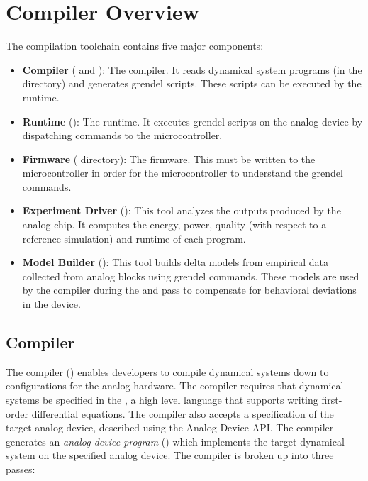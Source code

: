 \chapter{Compiler Overview}

The compilation toolchain contains five major components:

\begin{itemize}
\item\textbf{Compiler} ( and ): The compiler.
  It reads dynamical system programs (in the  directory) and generates
  grendel scripts. These scripts can be executed by the runtime.  
\item\textbf{Runtime} (): The runtime. It executes grendel
  scripts on the analog device by dispatching commands to the microcontroller.
\item\textbf{Firmware} ( directory): The firmware. This must be
  written to the microcontroller in order for the microcontroller to understand
  the grendel commands.
\item\textbf{Experiment Driver} (): This tool analyzes the outputs
  produced by the analog chip. It computes the energy, power, quality (with
  respect to a reference simulation) and runtime of each program.
\item\textbf{Model Builder} (): This tool builds delta
  models from empirical data collected from analog blocks using grendel
  commands. These models are used by the \legno compiler during the \lscale and
  \srcgen pass to compensate for behavioral deviations in the device. 
\end{itemize}


\section{\legno Compiler}

The \legno compiler () enables developers to compile dynamical
systems down to configurations for the analog hardware. The \legno compiler
requires that dynamical systems be specified in the , a high level language that supports writing first-order
differential equations. The \legno compiler also accepts a specification of the
target analog device, described using the Analog Device API. The \legno compiler
generates an \textit{analog device program} () which implements the target dynamical
system on the specified analog device. The compiler is broken up into three
passes:

